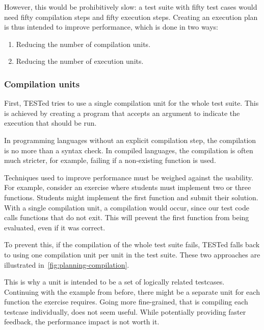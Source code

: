 \documentclass[../main]{subfiles}
\begin{document}
However, this would be prohibitively slow: a test suite with fifty test cases would need fifty compilation steps and fifty execution steps.
Creating an execution plan is thus intended to improve performance, which is done in two ways:

\begin{enumerate}[noitemsep]
    \item Reducing the number of compilation units.
    \item Reducing the number of execution units.
\end{enumerate}

\subsubsection{Compilation units}
\label{subsubsec:compilation-units}

First, TESTed tries to use a single compilation unit for the whole test suite.
This is achieved by creating a program that accepts an argument to indicate the execution that should be run.

In programming languages without an explicit compilation step, the compilation is no more than a syntax check.
In compiled languages, the compilation is often much stricter, for example, failing if a non-existing function is used.

Techniques used to improve performance must be weighed against the usability.
For example, consider an exercise where students must implement two or three functions.
Students might implement the first function and submit their solution.
With a single compilation unit, a compilation would occur, since our test code calls functions that do not exit.
This will prevent the first function from being evaluated, even if it was correct.

To prevent this, if the compilation of the whole test suite fails, TESTed falls back to using one compilation unit per unit in the test suite.
These two approaches are illustrated in~\cref{fig:planning-compilation}.

This is why a unit is intended to be a set of logically related testcases.
Continuing with the example from before, there might be a separate unit for each function the exercise requires.
Going more fine-grained, that is compiling each testcase individually, does not seem useful.
While potentially providing faster feedback, the performance impact is not worth it.
\end{document}
